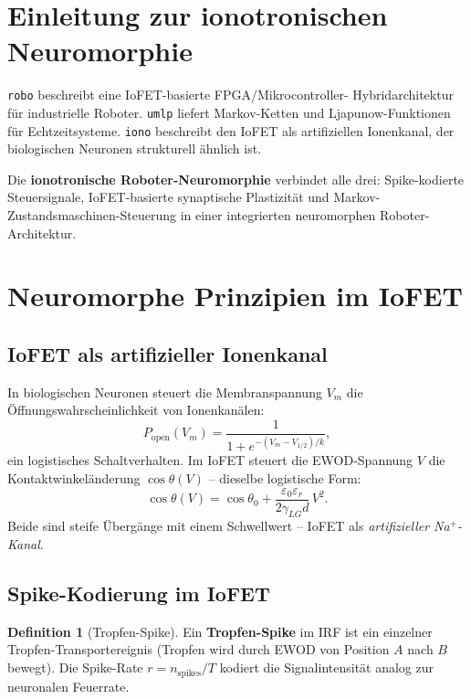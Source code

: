 ﻿\documentclass[a4paper,12pt]{scrreprt}
\theoremstyle{definition}
\newtheorem{definition}{Definition}[section]
\begin{document}
\section{Einleitung zur ionotronischen Neuromorphie}

\texttt{robo} beschreibt eine IoFET-basierte FPGA/Mikrocontroller-
Hybridarchitektur für industrielle Roboter. \texttt{umlp} liefert
Markov-Ketten und Ljapunow-Funktionen für Echtzeitsysteme.
\texttt{iono} beschreibt den IoFET als artifiziellen Ionenkanal, der
biologischen Neuronen strukturell ähnlich ist.

Die \textbf{ionotronische Roboter-Neuromorphie} verbindet alle drei:
Spike-kodierte Steuersignale, IoFET-basierte synaptische Plastizität
und Markov-Zustandsmaschinen-Steuerung in einer integrierten
neuromorphen Roboter-Architektur.

\section{Neuromorphe Prinzipien im IoFET}

\subsection{IoFET als artifizieller Ionenkanal}

In biologischen Neuronen steuert die Membranspannung $V_m$ die
Öffnungswahrscheinlichkeit von Ionenkanälen:
\[
  P_{\mathrm{open}}(V_m) = \frac{1}{1 + e^{-(V_m - V_{1/2})/k}},
\]
ein logistisches Schaltverhalten. Im IoFET steuert die EWOD-Spannung
$V$ die Kontaktwinkeländerung $\cos\theta(V)$ -- dieselbe logistische
Form:
\[
  \cos\theta(V) = \cos\theta_0 + \frac{\varepsilon_0\varepsilon_r}{2\gamma_{LG}d}\,V^2.
\]
Beide sind steife Übergänge mit einem Schwellwert -- IoFET als
\emph{artifizieller Na$^+$-Kanal}.

\subsection{Spike-Kodierung im IoFET}

\begin{definition}[Tropfen-Spike]
  Ein \textbf{Tropfen-Spike} im IRF ist ein einzelner Tropfen-Transportereignis
  (Tropfen wird durch EWOD von Position $A$ nach $B$ bewegt). Die
  Spike-Rate $r = n_{\mathrm{spikes}}/T$ kodiert die Signalintensität
  analog zur neuronalen Feuerrate.
\end{definition}
\end{document}
